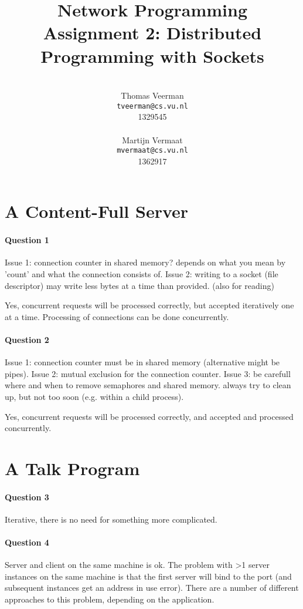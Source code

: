 \documentclass[a4paper,10pt]{article}
\title{Network Programming\\
\small{Assignment 2: Distributed Programming with Sockets}}
\author{%
        \mbox{}\\
        Thomas Veerman\\
        \texttt{tveerman@cs.vu.nl}\\
        1329545\\
        \mbox{}\\
        Martijn Vermaat\\
        \texttt{mvermaat@cs.vu.nl}\\
        1362917
}
\begin{document}
\maketitle


\section{A Content-Full Server}
\paragraph{Question 1}
Issue 1: connection counter in shared memory? depends on what you mean by 'count' and
what the connection consists of.
Issue 2: writing to a socket (file descriptor) may write less bytes at a time than
provided. (also for reading)

Yes, concurrent requests will be processed correctly, but accepted iteratively one at a
time. Processing of connections can be done concurrently.

\paragraph{Question 2}
Issue 1: connection counter must be in shared memory (alternative might be pipes).
Issue 2: mutual exclusion for the connection counter.
Issue 3: be carefull where and when to remove semaphores and shared memory. always try
to clean up, but not too soon (e.g. within a child process).

Yes, concurrent requests will be processed correctly, and accepted and processed
concurrently.

\section{A Talk Program}
\paragraph{Question 3}
Iterative, there is no need for something more complicated.

\paragraph{Question 4}
Server and client on the same machine is ok. The problem with >1 server instances on the
same machine is that the first server will bind to the port (and subsequent instances
get an address in use error). There are a number of different approaches to this problem,
depending on the application.
\end{document}
